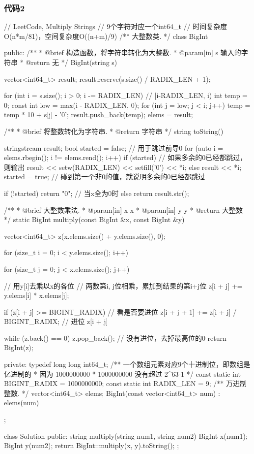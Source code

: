 \subsubsection{代码2}
\begin{Code}
// LeetCode, Multiply Strings
// 9个字符对应一个int64_t
// 时间复杂度O(n*m/81)，空间复杂度O((n+m)/9)
/** 大整数类. */
class BigInt {
public:
    /**
     * @brief 构造函数，将字符串转化为大整数.
     * @param[in] s 输入的字符串
     * @return 无
     */
    BigInt(string s) {
        vector<int64_t> result;
        result.reserve(s.size() / RADIX_LEN + 1);

        for (int i = s.size(); i > 0; i -= RADIX_LEN) {  // [i-RADIX_LEN, i)
            int temp = 0;
            const int low = max(i - RADIX_LEN, 0);
            for (int j = low; j < i; j++) {
                temp = temp * 10 + s[j] - '0';
            }
            result.push_back(temp);
        }
        elems = result;
    }
    /**
     * @brief 将整数转化为字符串.
     * @return 字符串
     */
    string toString() {
        stringstream result;
        bool started = false; // 用于跳过前导0
        for (auto i = elems.rbegin(); i != elems.rend(); i++) {
            if (started) { // 如果多余的0已经都跳过，则输出
                result << setw(RADIX_LEN) << setfill('0') << *i;
            } else {
                result << *i;
                started = true; // 碰到第一个非0的值，就说明多余的0已经都跳过
            }
        }

        if (!started) return "0"; // 当x全为0时
        else return result.str();
    }

    /**
     * @brief 大整数乘法.
     * @param[in] x x
     * @param[in] y y
     * @return 大整数
     */
    static BigInt multiply(const BigInt &x, const BigInt &y) {
        vector<int64_t> z(x.elems.size() + y.elems.size(), 0);

        for (size_t i = 0; i < y.elems.size(); i++) {
            for (size_t j = 0; j < x.elems.size(); j++) { // 用y[i]去乘以x的各位
                //  两数第i, j位相乘，累加到结果的第i+j位
                z[i + j] += y.elems[i] * x.elems[j];

                if (z[i + j] >= BIGINT_RADIX) { //  看是否要进位
                    z[i + j + 1] += z[i + j] / BIGINT_RADIX; //  进位
                    z[i + j] %
                }
            }
        }
        while (z.back() == 0) z.pop_back();  // 没有进位，去掉最高位的0
        return BigInt(z);
    }

private:
    typedef long long int64_t;
    /** 一个数组元素对应9个十进制位，即数组是亿进制的
     * 因为 1000000000 * 1000000000 没有超过 2^63-1
     */
    const static int BIGINT_RADIX = 1000000000;
    const static int RADIX_LEN = 9;
    /** 万进制整数. */
    vector<int64_t> elems;
    BigInt(const vector<int64_t> num) : elems(num) {}
};


class Solution {
public:
    string multiply(string num1, string num2) {
        BigInt x(num1);
        BigInt y(num2);
        return BigInt::multiply(x, y).toString();
    }
};
\end{Code}


